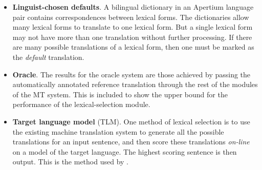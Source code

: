 \documentclass[11pt]{article}
\newcommand{\comment}[1]{\todo{#1}}
\begin{document}
\begin{itemize}
\addtolength{\itemsep}{-0.05in}
\item \textbf{Linguist-chosen defaults}. 
  A bilingual dictionary in an
  Apertium language pair contains correspondences between lexical
  forms. The dictionaries allow many lexical forms to translate to one
  lexical form. 
  But a single lexical form
  may not have more than one translation without further
  processing. If there are many possible translations of a lexical
  form, then one must be marked as the \emph{default} translation. 

\item \textbf{Oracle}.  The results for the oracle system are those
  achieved by passing the automatically annotated reference
  translation through the rest of the modules of the MT system. This
  is included to show the upper bound for the performance
  of the lexical-selection module. %

\item \textbf{Target language model} (TLM). One method of lexical
  selection is to use the existing machine translation system to
  generate all the possible translations for an input sentence, and
  then score these translations \emph{on-line} on a model of the
  target language. The highest scoring sentence is then output. This
  is the method used by %
  \cite{melero07a}.%
\end{itemize}
\end{document}
